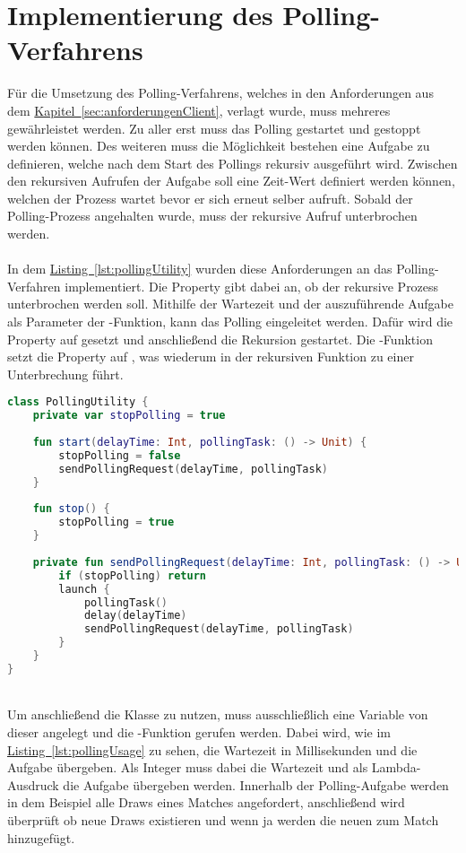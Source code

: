 \section{Implementierung des Polling-Verfahrens}
Für die Umsetzung des Polling-Verfahrens, welches in den Anforderungen aus dem \hyperref[sec:anforderungenClient]{Kapitel~\ref{sec:anforderungenClient}}, verlagt wurde, muss mehreres gewährleistet werden. Zu aller erst muss das Polling gestartet und gestoppt werden können. Des weiteren muss die Möglichkeit bestehen eine Aufgabe zu definieren, welche nach dem Start des Pollings rekursiv ausgeführt wird. Zwischen den rekursiven Aufrufen der Aufgabe soll eine Zeit-Wert definiert werden können, welchen der Prozess wartet bevor er sich erneut selber aufruft. Sobald der Polling-Prozess angehalten wurde, muss der rekursive Aufruf unterbrochen werden.\\
\\
In dem \hyperref[lst:pollingUtility]{Listing~\ref{lst:pollingUtility}} wurden diese Anforderungen an das Polling-Verfahren implementiert. Die Property  gibt dabei an, ob der rekursive Prozess unterbrochen werden soll. Mithilfe der Wartezeit und der auszuführende Aufgabe als Parameter der -Funktion, kann das Polling eingeleitet werden. Dafür wird die Property  auf  gesetzt und anschließend die Rekursion gestartet. Die -Funktion setzt die Property  auf , was wiederum in der rekursiven Funktion  zu einer Unterbrechung führt.\\
\begin{lstlisting}[style=lstStyleFramed, language=Kotlin, caption={Implementierung des Polling-Verfahrens}, label=lst:pollingUtility, float]
class PollingUtility {
	private var stopPolling = true
	
	fun start(delayTime: Int, pollingTask: () -> Unit) {
		stopPolling = false
		sendPollingRequest(delayTime, pollingTask)
	}
	
	fun stop() {
		stopPolling = true
	}
	
	private fun sendPollingRequest(delayTime: Int, pollingTask: () -> Unit) {
		if (stopPolling) return
		launch {
			pollingTask()
			delay(delayTime)
			sendPollingRequest(delayTime, pollingTask)
		}
	}
}
\end{lstlisting}
\\
Um anschließend die Klasse  zu nutzen, muss ausschließlich eine Variable von dieser angelegt und die -Funktion gerufen werden. Dabei wird, wie im \hyperref[lst:pollingUsage]{Listing~\ref{lst:pollingUsage}} zu sehen, die Wartezeit in Millisekunden und die Aufgabe übergeben. Als Integer muss dabei die Wartezeit und als Lambda-Ausdruck die Aufgabe übergeben werden. Innerhalb der Polling-Aufgabe werden in dem Beispiel alle Draws eines Matches angefordert, anschließend wird überprüft ob neue Draws existieren und wenn ja werden die neuen zum Match hinzugefügt.

